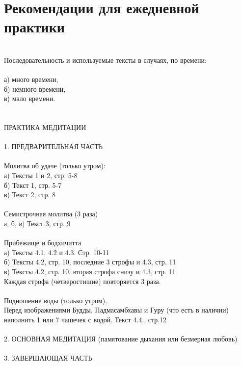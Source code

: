 \documentclass[4pt,oneside]{article}
\begin{document}
   \thispagestyle{empty}

\setmainfont{Geometria}

\scriptsize
\section*{Рекомендации для ежедневной практики}\\
\vspace{0.8cm}
Последовательность и используемые тексты в случаях, по времени:\\
\\
\indent а) много времени,\\
\indent б) немного времени,\\
\indent в) мало времени.\\
\\
\\
ПРАКТИКА МЕДИТАЦИИ\\
\\
1. ПРЕДВАРИТЕЛЬНАЯ ЧАСТЬ\\
\\
Молитва об удаче (только утром):\\
\indent а) Тексты 1 и 2, стр. 5-8\\
\indent б) Текст 1, стр. 5-7\\
\indent в) Текст 2, стр. 8\\

\\
\noindent Семистрочная молитва (3 раза)\\
\indent а, б, в) Текст 3, стр. 9\\
\\
Прибежище и бодхичитта\\
\indent а) Тексты 4.1, 4.2 и 4.3. Стр. 10-11\\
\indent б) Тексты 4.2, стр. 10, последние 3 строфы и 4.3, стр. 11\\
\indent в) Тексты 4.2, стр. 10, вторая строфа снизу и 4.3, стр. 11\\
\indent Каждая строфа (четверостишие) повторяется 3 раза.\\
\\
Подношение воды (только утром).\\
\indent Перед изображениями Будды, Падмасамбхавы и Гуру (что есть в наличии)\\
\indent наполнить 1 или 7 чашечек с водой.
        Текст 4.4., стр.12\\
\\
2. ОСНОВНАЯ МЕДИТАЦИЯ (памятование дыхания или безмерная любовь)\\
\\
3. ЗАВЕРШАЮЩАЯ ЧАСТЬ\\
\end{document}
